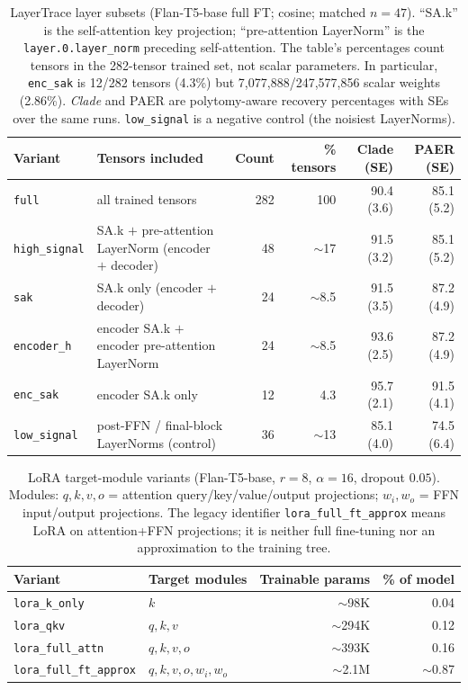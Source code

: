 \documentclass{article}
\theoremstyle{definition}
\theoremstyle{plain}
\begin{document}
\begin{table}[h]
\caption{LayerTrace layer subsets (Flan-T5-base full FT; cosine; matched $n=47$). ``SA.k'' is the self-attention key projection;
``pre-attention LayerNorm'' is the \texttt{layer.0.layer\_norm} preceding self-attention. The table's
percentages count tensors in the 282-tensor trained set, not scalar parameters. In particular,
\texttt{enc\_sak} is 12/282 tensors (4.3\%) but 7,077,888/247,577,856 scalar weights (2.86\%).
\emph{Clade} and PAER are polytomy-aware recovery percentages with SEs over the same runs.
\texttt{low\_signal} is a negative control (the noisiest LayerNorms).}
\label{tab:layer_subsets}
\centering
\small
\setlength{\tabcolsep}{3pt}
\begin{tabular}{llrrrr}
\toprule
Variant & Tensors included & Count & \% tensors & Clade (SE) & PAER (SE) \\
\midrule
\texttt{full}         & all trained tensors                                   & 282 & 100          & 90.4 (3.6) & 85.1 (5.2) \\
\texttt{high\_signal} & SA.k $+$ pre-attention LayerNorm (encoder $+$ decoder) & 48  & $\sim$17     & 91.5 (3.2) & 85.1 (5.2) \\
\texttt{sak}          & SA.k only (encoder $+$ decoder)                       & 24  & $\sim$8.5    & 91.5 (3.5) & 87.2 (4.9) \\
\texttt{encoder\_h}   & encoder SA.k $+$ encoder pre-attention LayerNorm      & 24  & $\sim$8.5    & 93.6 (2.5) & 87.2 (4.9) \\
\texttt{enc\_sak}     & encoder SA.k only                                     & 12  & 4.3           & 95.7 (2.1) & 91.5 (4.1) \\
\texttt{low\_signal}  & post-FFN / final-block LayerNorms (control)           & 36  & $\sim$13     & 85.1 (4.0) & 74.5 (6.4) \\
\bottomrule
\end{tabular}
\end{table}

\begin{table}[h]
\caption{LoRA target-module variants (Flan-T5-base, $r=8$, $\alpha=16$, dropout $0.05$). Modules:
$q,k,v,o$ = attention query/key/value/output projections; $w_i,w_o$ = FFN input/output projections.
The legacy identifier \texttt{lora\_full\_ft\_approx} means LoRA on attention+FFN projections; it is
neither full fine-tuning nor an approximation to the training tree.}
\label{tab:lora_variants}
\centering
\begin{tabular}{ll r r}
\toprule
Variant & Target modules & Trainable params & \% of model \\
\midrule
\texttt{lora\_k\_only}        & $k$                       & $\sim$98K  & 0.04 \\
\texttt{lora\_qkv}            & $q,k,v$                   & $\sim$294K & 0.12 \\
\texttt{lora\_full\_attn}     & $q,k,v,o$                 & $\sim$393K & 0.16 \\
\texttt{lora\_full\_ft\_approx}& $q,k,v,o,w_i,w_o$        & $\sim$2.1M & $\sim$0.87 \\
\bottomrule
\end{tabular}
\end{table}
\end{document}
